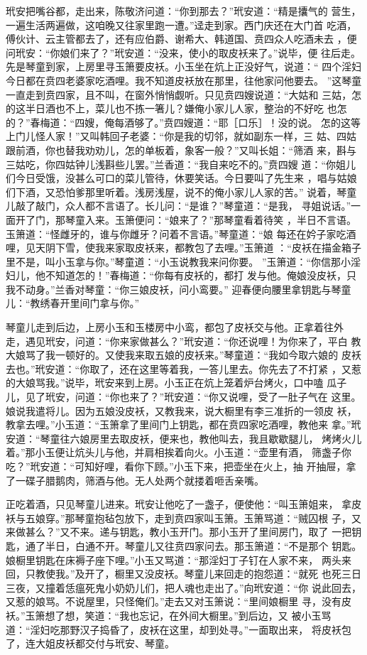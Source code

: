 玳安把嘴谷都，走出来，陈敬济问道：“你到那去？”玳安道：“精是攮气的
营生，一遍生活两遍做，这咱晚又往家里跑一遭。”迳走到家。西门庆还在大门首
吃酒，傅伙计、云主管都去了，还有应伯爵、谢希大、韩道国、贲四众人吃酒未去
，便问玳安：“你娘们来了？”玳安道：“没来，使小的取皮袄来了。”说毕，便
往后走。先是琴童到家，上房里寻玉箫要皮袄。小玉坐在炕上正没好气，说道：“
四个淫妇今日都在贲四老婆家吃酒哩。我不知道皮袄放在那里，往他家问他要去。
”这琴童一直走到贲四家，且不叫，在窗外悄悄觑听。只见贲四嫂说道：“大姑和
三姑，怎的这半日酒也不上，菜儿也不拣一箸儿？嫌俺小家儿人家，整治的不好吃
也怎的？”春梅道：“四嫂，俺每酒够了。”贲四嫂道：“耶［口乐］！没的说。
怎的这等上门儿怪人家！”又叫韩回子老婆：“你是我的切邻，就如副东一样，三
姑、四姑跟前酒，你也替我劝劝儿，怎的单板着，象客一般？”又叫长姐：“筛酒
来，斟与三姑吃，你四姑钟儿浅斟些儿罢。”兰香道：“我自来吃不的。”贲四嫂
道：“你姐儿们今日受饿，没甚么可口的菜儿管待，休要笑话。今日要叫了先生来
，唱与姑娘们下酒，又恐怕爹那里听着。浅房浅屋，说不的俺小家儿人家的苦。”
说着，琴童儿敲了敲门，众人都不言语了。长儿问：“是谁？”琴童道：“是我，
寻姐说话。”一面开了门，那琴童入来。玉箫便问：“娘来了？”那琴童看着待笑
，半日不言语。玉箫道：“怪雌牙的，谁与你雌牙？问着不言语。”琴童道：“娘
每还在妗子家吃酒哩，见天阴下雪，使我来家取皮袄来，都教包了去哩。”玉箫道
：“皮袄在描金箱子里不是，叫小玉拿与你。”琴童道：“小玉说教我来问你要。
”玉箫道：“你信那小淫妇儿，他不知道怎的！”春梅道：“你每有皮袄的，都打
发与他。俺娘没皮袄，只我不动身。”兰香对琴童：“你三娘皮袄，问小鸾要。”
迎春便向腰里拿钥匙与琴童儿：“教绣春开里间门拿与你。”

琴童儿走到后边，上房小玉和玉楼房中小鸾，都包了皮袄交与他。正拿着往外
走，遇见玳安，问道：“你来家做甚么？”玳安道：“你还说哩！为你来了，平白
教大娘骂了我一顿好的。又使我来取五娘的皮袄来。”琴童道：“我如今取六娘的
皮袄去也。”玳安道：“你取了，还在这里等着我，一答儿里去。你先去了不打紧
，又惹的大娘骂我。”说毕，玳安来到上房。小玉正在炕上笼着炉台烤火，口中嗑
瓜子儿，见了玳安，问道：“你也来了？”玳安道：“你又说哩，受了一肚子气在
这里。娘说我遣将儿。因为五娘没皮袄，又教我来，说大橱里有李三准折的一领皮
袄，教拿去哩。”小玉道：“玉箫拿了里间门上钥匙，都在贲四家吃酒哩，教他来
拿。”玳安道：“琴童往六娘房里去取皮袄，便来也，教他叫去，我且歇歇腿儿，
烤烤火儿着。”那小玉便让炕头儿与他，并肩相挨着向火。小玉道：“壶里有酒，
筛盏子你吃？”玳安道：“可知好哩，看你下顾。”小玉下来，把壶坐在火上，抽
开抽屉，拿了一碟子腊鹅肉，筛酒与他。无人处两个就搂着咂舌亲嘴。

正吃着酒，只见琴童儿进来。玳安让他吃了一盏子，便使他：“叫玉箫姐来，
拿皮袄与五娘穿。”那琴童抱毡包放下，走到贲四家叫玉箫。玉箫骂道：“贼囚根
子，又来做甚么？”又不来。递与钥匙，教小玉开门。那小玉开了里间房门，取了
一把钥匙，通了半日，白通不开。琴童儿又往贲四家问去。那玉箫道：“不是那个
钥匙。娘橱里钥匙在床褥子座下哩。”小玉又骂道：“那淫妇丁子钉在人家不来，
两头来回，只教使我。”及开了，橱里又没皮袄。琴童儿来回走的抱怨道：“就死
也死三日三夜，又撞着恁瘟死鬼小奶奶儿们，把人魂也走出了。”向玳安道：“你
说此回去，又惹的娘骂。不说屋里，只怪俺们。”走去又对玉箫说：“里间娘橱里
寻，没有皮袄。”玉箫想了想，笑道：“我也忘记，在外间大橱里。”到后边，又
被小玉骂道：“淫妇吃那野汉子捣昏了，皮袄在这里，却到处寻。”一面取出来，
将皮袄包了，连大姐皮袄都交付与玳安、琴童。

